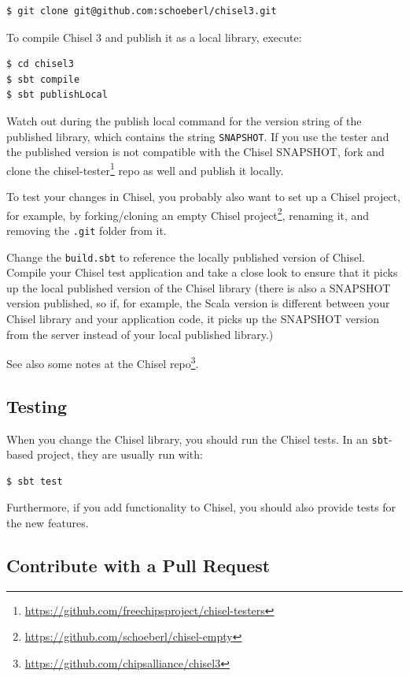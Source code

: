 \documentclass[%
    10pt,
    headinclude, footexclude,
    openright, %
    notitlepage,
    cleardoubleempty,
    headsepline,
    pointlessnumbers,
    bibtotoc, idxtotoc,
    ]{scrbook}
\newcommand{\code}[1]{{\lstinline[basicstyle=\small\ttfamily]{#1}}}
\newcommand{\myref}[2]{\href{#1}{#2}}
\renewcommand{\myref}[2]{{#2}{\footnote{\url{#1}}}}
\begin{document}
\begin{verbatim}
$ git clone git@github.com:schoeberl/chisel3.git
\end{verbatim}

To compile Chisel 3 and publish it as a local library, execute:
\begin{verbatim}
$ cd chisel3
$ sbt compile
$ sbt publishLocal
\end{verbatim}

Watch out during the publish local command for the version string of the published
library, which contains the string \code{SNAPSHOT}.
If you use the tester and the published version is not compatible with the Chisel
SNAPSHOT, fork and clone the \myref{https://github.com/freechipsproject/chisel-testers}{chisel-tester}
repo as well and publish it locally.

To test your changes in Chisel, you probably also want to set up a Chisel project,
for example, by forking/cloning an \myref{https://github.com/schoeberl/chisel-empty}{empty Chisel project},
renaming it, and removing the \code{.git} folder from it.

Change the \code{build.sbt} to reference the locally published version of Chisel.
Compile your Chisel test application and take a close look to ensure that it picks up the local published
version of the Chisel library (there is also a SNAPSHOT version published, so if, for example,
the Scala version is different between your Chisel library and your application code,
it picks up the SNAPSHOT version from the server instead of your local published
library.)

See also \myref{https://github.com/chipsalliance/chisel3}{some notes
at the Chisel repo}.

\subsection{Testing}

When you change the Chisel library, you should run the Chisel tests.
In an \code{sbt}-based project, they are usually run with:

\begin{verbatim}
$ sbt test
\end{verbatim}

Furthermore, if you add functionality to Chisel, you should also provide tests for the
new features.

\subsection{Contribute with a Pull Request}
\end{document}
